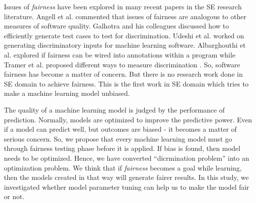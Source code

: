 \documentclass[10pt,conference]{IEEEtran}
\begin{document}

Issues of \textit{fairness} have been explored in many  recent papers in the SE research literature. Angell et al. \cite{Angell:2018:TAT:3236024.3264590}  commented that issues of fairness are analogous to other measures of software quality. Galhotra and his colleagues discussed how to efficiently generate test cases to test for discrimination\cite{Galhotra_2017}. Udeshi et al. \cite{Udeshi_2018} worked on generating discriminatory  inputs for machine learning software. Albarghouthi et al. \cite{Albarghouthi:2019:FP:3287560.3287588} explored if fairness can be wired into annotations within a program while Tramer et al. proposed different ways to measure discrimination \cite{Tramer_2017}. So, software fairness has become a matter of concern. But there is no research work done in SE domain to achieve fairness. This is the first work in SE domain which tries to make a machine learning model unbiased.

 The quality of a machine learning model is judged by the performance of prediction. Normally, models are optimized to improve the predictive power. Even if a model can predict well, but outcomes are biased - it becomes a matter of serious concern. So, we propose that every machine learning model must go through fairness testing phase before it is applied. If bias is found, then model needs to be optimized. Hence, we have converted ``dicrmination problem'' into an optimization problem. We think that if \textit{fairness} becomes a goal while learning, then the  models created in that way will generate fairer results. In this study, we investigated whether model parameter tuning can help us to make the model fair or not. 
 
\end{document}
